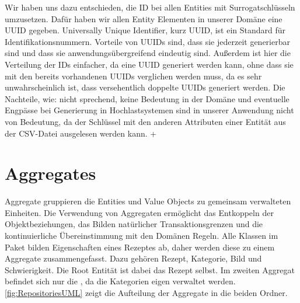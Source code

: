 Wir haben uns dazu entschieden, die ID bei allen Entities mit Surrogatschlüsseln umzusetzen. Dafür haben wir allen Entity Elementen in unserer Domäne eine UUID gegeben. Universally Unique Identifier, kurz UUID, ist ein Standard für Identifikationsnummern. Vorteile von UUIDs sind, dass sie jederzeit generierbar sind und dass sie anwendungsübergreifend eindeutig sind. Außerdem ist hier die Verteilung der IDs einfacher, da eine UUID generiert werden kann, ohne dass sie mit den bereits vorhandenen UUIDs verglichen werden muss, da es sehr unwahrscheinlich ist, dass versehentlich doppelte UUIDs generiert werden. Die Nachteile, wie: nicht sprechend, keine Bedeutung in der Domäne und eventuelle Engpässe bei Generierung in
Hochlastsystemen sind in unserer Anwendung nicht von Bedeutung, da der Schlüssel mit den anderen Attributen einer Entität aus der CSV-Datei ausgelesen werden kann.
+
\section{Aggregates}
Aggregate gruppieren die Entities und Value Objects zu gemeinsam verwalteten Einheiten. Die Verwendung von Aggregaten ermöglicht das Entkoppeln der Objektbeziehungen, das Bilden natürlicher Transaktionsgrenzen und die kontinuierliche Übereinstimmung mit den Domänen Regeln.
Alle Klassen im Paket \href{https://github.com/MichaelaHaag/RezeptApp/tree/main/3-Domain-Code/src/main/java/de/rezeptapp/domain/Rezept}{} bilden Eigenschaften eines Rezeptes ab, daher werden diese zu einem Aggregate zusammengefasst. Dazu gehören Rezept, Kategorie, Bild und Schwierigkeit. Die Root Entität ist dabei das Rezept selbst. Im zweiten Aggregat befindet sich nur die \href{https://github.com/MichaelaHaag/RezeptApp/tree/main/3-Domain-Code/src/main/java/de/rezeptapp/domain/Kategorie}{}, da die Kategorien eigen verwaltet werden. \autoref{fig:RepositoriesUML} zeigt die Aufteilung der Aggregate in die beiden Ordner. 

